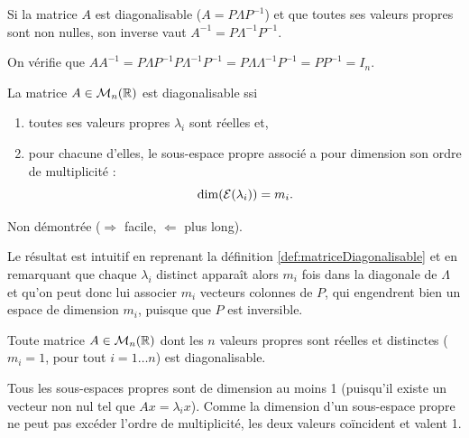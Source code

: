 

\begin{proposition}
  Si la matrice $A$ est diagonalisable ($A = P \Lambda P^{-1}$) et que toutes ses valeurs propres sont non nulles, son inverse vaut $A^{-1} = P \Lambda^{-1} P^{-1}$.
\end{proposition}

\proof
On vérifie que $A A^{-1} = P \Lambda P^{-1} P \Lambda^{-1} P^{-1} = P \Lambda \Lambda^{-1} P^{-1} = P P^{-1} = I_n$.
\eproof

\begin{theorem}
  La matrice $A \in \mathcal{M}_n(\mathbb{R})$ est diagonalisable ssi 
  \begin{enumerate}
   \item toutes ses valeurs propres $\lambda_i$ sont réelles et, 
   \item pour chacune d'elles, le sous-espace propre associé a pour dimension son ordre de multiplicité : 
   $$
   \dim(\mathcal{E}(\lambda_i)) = m_i.
   $$
  \end{enumerate}
\end{theorem}

\proof
Non démontrée ($\Rightarrow$ facile, $\Leftarrow$ plus long).
\eproof

\remark
Le résultat est intuitif en reprenant la définition \ref{def:matriceDiagonalisable} et en remarquant que chaque $\lambda_i$ distinct apparaît alors $m_i$ fois dans la diagonale de $\Lambda$ et qu'on peut donc lui associer $m_i$ vecteurs colonnes de $P$, qui engendrent bien un espace de dimension $m_i$, puisque que $P$ est inversible.

\begin{corollary*}
  Toute matrice $A \in \mathcal{M}_n(\mathbb{R})$ dont les $n$ valeurs propres sont réelles et distinctes ($m_i = 1$, pour tout $i = 1 \dots n$) est diagonalisable.
\end{corollary*}

\proof
Tous les sous-espaces propres sont de dimension au moins 1 (puisqu'il existe un vecteur non nul tel que $Ax = \lambda_i x$). Comme la dimension d'un sous-espace propre ne peut pas excéder l'ordre de multiplicité, les deux valeurs coïncident et valent 1.
\eproof

